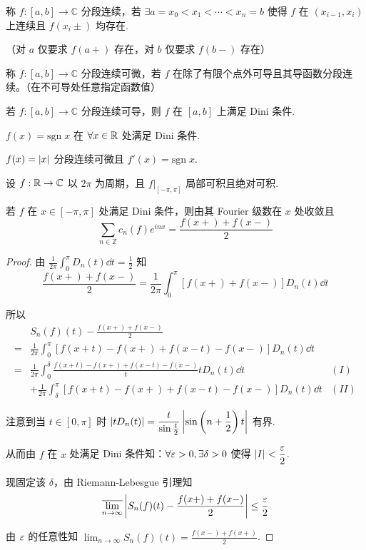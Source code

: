 \begin{definition}
    称 $f:[a,b]\to\mathbb{C}$ 分段连续，若 $\exists a=x_0<x_1<\cdots<x_n=b$ 使得 $f$ 在 $(x_{i-1},x_i)$ 上连续且 $f(x_i\pm)$ 均存在.

    （对 $a$ 仅要求 $f(a+)$ 存在，对 $b$ 仅要求 $f(b-)$ 存在）
\end{definition}

\begin{definition}
    称 $f:[a,b]\to\mathbb{C}$ 分段连续可微，若 $f$ 在除了有限个点外可导且其导函数分段连续。（在不可导处任意指定函数值）
\end{definition}

\begin{property}
    若 $f:[a,b]\to\mathbb{C}$ 分段连续可导，则 $f$ 在 $[a,b]$ 上满足 Dini 条件.
\end{property}

\begin{example}
    $f(x)=\mathrm{sgn}\;x$ 在 $\forall x\in\mathbb{R}$ 处满足 Dini 条件.
\end{example}

\begin{example}
    $f(x)=\left\lvert{x}\right\rvert$ 分段连续可微且 $f'(x)=\mathrm{sgn}\;x$.
\end{example}

\begin{theorem}
    设 $f:\mathbb{R}\to\mathbb{C}$ 以 $2\pi$ 为周期，且 $f|_{[-\pi,\pi]}$ 局部可积且绝对可积.

    若 $f$ 在 $x\in[-\pi,\pi]$ 处满足 Dini 条件，则由其 Fourier 级数在 $x$ 处收敛且
$$
\sum_{n\in\mathbb{Z}}c_n(f)e^{inx}=\frac{f(x+)+f(x-)}{2}
$$
\end{theorem}
\begin{proof}
    由 $\displaystyle\frac{1}{2\pi}\int_0^\pi D_n(t)\dd t=\frac{1}{2}$ 知
$$
\frac{f(x+)+f(x-)}{2}=\frac{1}{2\pi}\int_0^\pi[f(x+)+f(x-)]D_n(t)\dd t
$$

    所以
$$
\begin{aligned}
    &S_n(f)(t)-\frac{f(x+)+f(x-)}{2}\\
    =&\frac{1}{2\pi}\int_0^\pi[f(x+t)-f(x+)+f(x-t)-f(x-)]D_n(t)\dd t\\
    =&\frac{1}{2\pi}\int_0^\delta\frac{f(x+t)-f(x+)+f(x-t)-f(x-)}{t}tD_n(t)\dd t \qquad & (I)\\
    &+\frac{1}{2\pi}\int_\delta^\pi[f(x+t)-f(x+)+f(x-t)-f(x-)]D_n(t)\dd t & (II)
\end{aligned}
$$

    注意到当 $t\in[0,\pi]$ 时 $\left\lvert{tD_n(t)}\right\rvert=\dfrac{t}{\sin\frac{t}{2}}\left\lvert{\sin\left(n+\dfrac{1}{2}\right)t}\right\rvert$ 有界.

    从而由 $f$ 在 $x$ 处满足 Dini 条件知：$\forall\varepsilon>0,\exists\delta>0$ 使得 $\left\lvert{I}\right\rvert<\dfrac{\varepsilon}{2}$.

    现固定该 $\delta$，由 Riemann-Lebesgue 引理知
$$
\overline{\lim_{n\to\infty}}\left\lvert{S_n(f)(t)-\frac{f(x+)+f(x-)}{2}}\right\rvert\le\frac{\varepsilon}{2}
$$

    由 $\varepsilon$ 的任意性知 $\displaystyle\lim_{n\to\infty}S_n(f)(t)=\frac{f(x-)+f(x+)}{2}$.
\end{proof}

